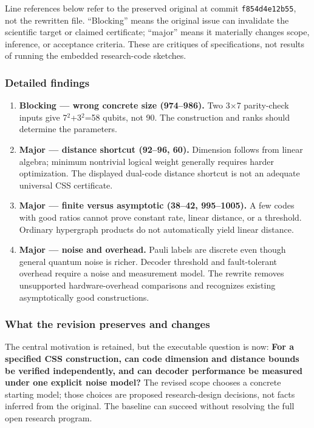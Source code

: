 \documentclass[
  11pt,
]{article}
\begin{document}
Line references below refer to the preserved original at commit
\texttt{f854d4e12b55}, not the rewritten file. ``Blocking'' means the
original issue can invalidate the scientific target or claimed
certificate; ``major'' means it materially changes scope, inference, or
acceptance criteria. These are critiques of specifications, not results
of running the embedded research-code sketches.

\subsubsection{Detailed findings}

\begin{enumerate}
\def\labelenumi{\arabic{enumi}.}
\item
  \textbf{Blocking --- wrong concrete size (974--986).} Two
  3\ensuremath{\times}7 parity-check inputs give
  7\ensuremath{{}^{2}}+3\ensuremath{{}^{2}}=58 qubits, not 90. The
  construction and ranks should determine the parameters.
\item
  \textbf{Major --- distance shortcut (92--96, 60).} Dimension follows
  from linear algebra; minimum nontrivial logical weight generally
  requires harder optimization. The displayed dual-code distance
  shortcut is not an adequate universal CSS certificate.
\item
  \textbf{Major --- finite versus asymptotic (38--42, 995--1005).} A few
  codes with good ratios cannot prove constant rate, linear distance, or
  a threshold. Ordinary hypergraph products do not automatically yield
  linear distance.
\item
  \textbf{Major --- noise and overhead.} Pauli labels are discrete even
  though general quantum noise is richer. Decoder threshold and
  fault-tolerant overhead require a noise and measurement model. The
  rewrite removes unsupported hardware-overhead comparisons and
  recognizes existing asymptotically good constructions.
\end{enumerate}

\subsubsection{What the revision preserves and changes}

The central motivation is retained, but the executable question is now:
\textbf{For a specified CSS construction, can code dimension and
distance bounds be verified independently, and can decoder performance
be measured under one explicit noise model?} The revised scope chooses a
concrete starting model; those choices are proposed research-design
decisions, not facts inferred from the original. The baseline can
succeed without resolving the full open research program.
\end{document}
